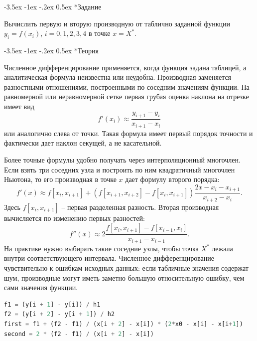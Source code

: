 \documentclass[14pt, a4paper]{article}
\makeatletter
\renewcommand\section{\@startsection {section}{1}{\parindent}%
  {-3.5ex \@plus -1ex \@minus -.2ex}%
  {0.5ex}%
  {\normalfont\Large\bfseries}}
\makeatother
\begin{document}
\section*{Задание}
Вычислить первую и вторую производную от таблично заданной функции $y_i = f(x_i)$, $i = 0, 1, 2, 3, 4$ в точке $x = X^*$.

\section*{Теория}
Численное дифференцирование применяется, когда функция задана таблицей, а аналитическая формула неизвестна или неудобна. Производная заменяется разностными отношениями, построенными по соседним значениям функции. На равномерной или неравномерной сетке первая грубая оценка наклона на отрезке имеет вид
\[
    f'(x_i)\approx\frac{y_{i+1}-y_i}{x_{i+1}-x_i}
\]
или аналогично слева от точки. Такая формула имеет первый порядок точности и фактически дает наклон секущей, а не касательной.

Более точные формулы удобно получать через интерполяционный многочлен. Если взять три соседних узла и построить по ним квадратичный многочлен Ньютона, то его производная в точке $x$ дает формулу второго порядка:
\[
    f'(x)\approx f[x_i,x_{i+1}]+
    \left(f[x_{i+1},x_{i+2}]-f[x_i,x_{i+1}]\right)
    \frac{2x-x_i-x_{i+1}}{x_{i+2}-x_i}.
\]
Здесь $f[x_i,x_{i+1}]$ -- первая разделенная разность. Вторая производная вычисляется по изменению первых разностей:
\[
    f''(x)\approx 2\frac{f[x_i,x_{i+1}]-f[x_{i-1},x_i]}{x_{i+1}-x_{i-1}}.
\]
На практике нужно выбирать такие соседние узлы, чтобы точка $X^*$ лежала внутри соответствующего интервала. Численное дифференцирование чувствительно к ошибкам исходных данных: если табличные значения содержат шум, производные могут иметь заметно большую относительную ошибку, чем сами значения функции.

\begin{lstlisting}[language=Python]
f1 = (y[i + 1] - y[i]) / h1
f2 = (y[i + 2] - y[i + 1]) / h2
first = f1 + (f2 - f1) / (x[i + 2] - x[i]) * (2*x0 - x[i] - x[i+1])
second = 2 * (f2 - f1) / (x[i + 2] - x[i])
\end{lstlisting}
\end{document}
